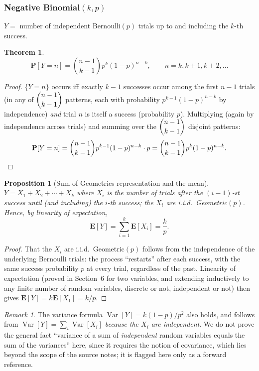 \documentclass[11pt]{article}
\theoremstyle{definition}
\theoremstyle{plain}
\newtheorem{theorem}[definition]{Theorem}
\newtheorem{proposition}[definition]{Proposition}
\theoremstyle{remark}
\newtheorem{remark}[definition]{Remark}
\newcommand{\E}[1]{\mathbf{E}\!\left[#1\right]}
\newcommand{\Var}[1]{\operatorname{Var}\!\left[#1\right]}
\begin{document}
\subsubsection{Negative Binomial$(k,p)$}

$Y=$ number of independent Bernoulli$(p)$ trials up to and including the $k$-th success.

\begin{theorem}
\[
\mathbf{P}[Y=n] = \binom{n-1}{k-1}p^k(1-p)^{n-k}, \qquad n=k,k+1,k+2,\dots
\]
\end{theorem}
\begin{proof}
$\{Y=n\}$ occurs iff exactly $k-1$ successes occur among the first $n-1$ trials (in any of
$\dbinom{n-1}{k-1}$ patterns, each with probability $p^{k-1}(1-p)^{n-k}$ by independence) \emph{and}
trial $n$ is itself a success (probability $p$). Multiplying (again by independence across trials)
and summing over the $\dbinom{n-1}{k-1}$ disjoint patterns:
\[
\mathbf{P}[Y=n] = \binom{n-1}{k-1}p^{k-1}(1-p)^{n-k}\cdot p = \binom{n-1}{k-1}p^k(1-p)^{n-k}.
\qedhere
\]
\end{proof}

\begin{proposition}[Sum of Geometrics representation and the mean]
$Y = X_1+X_2+\cdots+X_k$ where $X_i$ is the number of trials \emph{after} the $(i-1)$-st success
until (and including) the $i$-th success; the $X_i$ are i.i.d.\ Geometric$(p)$. Hence, by linearity
of expectation,
\[
\E{Y} = \sum_{i=1}^k \E{X_i} = \frac{k}{p}.
\]
\end{proposition}
\begin{proof}
That the $X_i$ are i.i.d.\ Geometric$(p)$ follows from the independence of the underlying Bernoulli
trials: the process ``restarts'' after each success, with the same success probability $p$ at
every trial, regardless of the past. Linearity of expectation (proved in Section~6 for two
variables, and extending inductively to any finite number of random variables, discrete or not,
independent or not) then gives $\E{Y}=k\E{X_1}=k/p$.
\end{proof}

\begin{remark}
The variance formula $\Var{Y} = k(1-p)/p^2$ also holds, and follows from $\Var{Y}=\sum_i\Var{X_i}$
\emph{because the $X_i$ are independent}. We do not prove the general fact ``variance of a sum of
\emph{independent} random variables equals the sum of the variances'' here, since it requires the
notion of covariance, which lies beyond the scope of the source notes; it is flagged here only as
a forward reference.
\end{remark}
\end{document}
